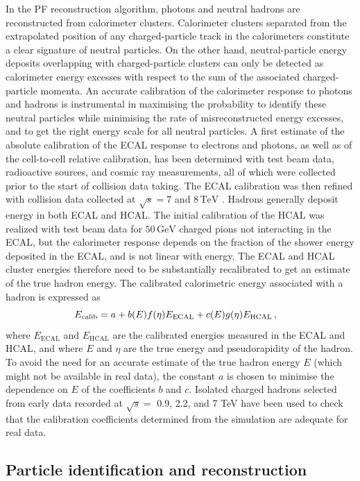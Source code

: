 In the PF reconstruction algorithm, photons and neutral hadrons are reconstructed from calorimeter clusters. Calorimeter clusters separated from the extrapolated position of any charged-particle track in the calorimeters constitute a clear signature of neutral particles.  On the other hand, neutral-particle energy deposits overlapping with charged-particle clusters can only be detected  as  calorimeter  energy  excesses  with  respect  to  the  sum  of  the  associated  charged-particle momenta. An accurate calibration of the calorimeter response to photons and hadrons is instrumental in maximising the probability to identify these neutral particles while minimising the rate of misreconstructed energy excesses, and to get the right energy scale for all neutral particles. A first estimate of the absolute calibration of the ECAL response to electrons and photons, as well as of the cell-to-cell relative calibration, has been determined with test beam data, radioactive sources,  and cosmic ray measurements,  all of which were collected prior to the start of collision data taking.  The ECAL calibration was then refined with collision data collected at $\sqrt{s}=7$ and $8\,\mathrm{TeV}$ \cite{2013}. Hadrons generally deposit energy in both ECAL and HCAL. The initial calibration of the HCAL was realized with test beam data for $50\,\mathrm{GeV}$ charged pions not interacting in the ECAL, but the calorimeter response depends on the fraction of the shower energy deposited in the ECAL, and is not linear with energy. The ECAL and HCAL cluster energies therefore need to be substantially recalibrated to get an estimate of the true hadron energy. The calibrated calorimetric energy associated with a hadron is expressed as
\begin{equation}
    E_{\mathrm{calib}} = a + b(E)f(\eta)E_{\mathrm{ECAL}} + c(E)g(\eta)E_{\mathrm{HCAL}} \msep
\end{equation}
where $E_{\mathrm{ECAL}}$ and $E_{\mathrm{HCAL}}$ are the calibrated energies measured in the ECAL and HCAL, and where $E$ and $\eta$ are the true energy and pseudorapidity of the hadron. To avoid the need for an accurate estimate of the true hadron energy $E$ (which might not be available in real data),  the constant $a$ is chosen to minimise the dependence on $E$ of the coefficients $b$ and $c$. Isolated charged hadrons selected from early data recorded at $\sqrt{s}=$ 0.9, 2.2, and 7 TeV have been used to check that the calibration coefficients determined from the simulation are adequate for real data.

\subsection{Particle identification and reconstruction}

